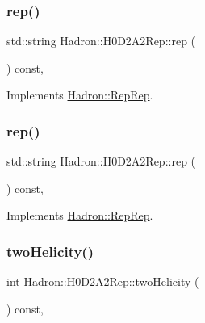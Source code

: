 \subsubsection{\texorpdfstring{rep()}{rep()}\hspace{0.1cm}{\footnotesize\ttfamily [2/3]}}
{\footnotesize\ttfamily std\+::string Hadron\+::\+H0\+D2\+A2\+Rep\+::rep (\begin{DoxyParamCaption}{ }\end{DoxyParamCaption}) const\hspace{0.3cm}{\ttfamily [inline]}, {\ttfamily [virtual]}}



Implements \mbox{\hyperlink{structHadron_1_1RepRep_ab3213025f6de249f7095892109575fde}{Hadron\+::\+Rep\+Rep}}.

\mbox{\label{structHadron_1_1H0D2A2Rep_ae0f8b84aedb60c30e04ff9aa344142a6}} 
\subsubsection{\texorpdfstring{rep()}{rep()}\hspace{0.1cm}{\footnotesize\ttfamily [3/3]}}
{\footnotesize\ttfamily std\+::string Hadron\+::\+H0\+D2\+A2\+Rep\+::rep (\begin{DoxyParamCaption}{ }\end{DoxyParamCaption}) const\hspace{0.3cm}{\ttfamily [inline]}, {\ttfamily [virtual]}}



Implements \mbox{\hyperlink{structHadron_1_1RepRep_ab3213025f6de249f7095892109575fde}{Hadron\+::\+Rep\+Rep}}.

\mbox{\label{structHadron_1_1H0D2A2Rep_ac561e7d1621438c3f64d1d13a2f62098}} 
\subsubsection{\texorpdfstring{twoHelicity()}{twoHelicity()}\hspace{0.1cm}{\footnotesize\ttfamily [1/2]}}
{\footnotesize\ttfamily int Hadron\+::\+H0\+D2\+A2\+Rep\+::two\+Helicity (\begin{DoxyParamCaption}{ }\end{DoxyParamCaption}) const\hspace{0.3cm}{\ttfamily [inline]}, {\ttfamily [virtual]}}

